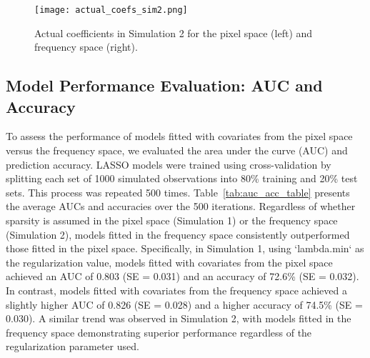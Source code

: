 \documentclass[12pt]{article}
\begin{document}
\begin{figure}[h!]
	\centering
	\texttt{[image: actual\_coefs\_sim2.png]}
	\caption{Actual coefficients in Simulation 2 for the pixel space (left) and frequency space (right).}
	\label{fig:coefs_sim2}
\end{figure}

\FloatBarrier

\subsection*{Model Performance Evaluation: AUC and Accuracy}

To assess the performance of models fitted with covariates from the pixel space versus the frequency space, we evaluated
the area under the curve (AUC) and prediction accuracy. LASSO models were trained using cross-validation by splitting
each set of 1000 simulated observations into 80\% training and 20\% test sets. This process was repeated 500 times.
Table~\ref*{tab:auc_acc_table} presents the average AUCs and accuracies over the 500 iterations. Regardless of whether
sparsity is assumed in the pixel space (Simulation 1) or the frequency space (Simulation 2), models fitted in the
frequency space consistently outperformed those fitted in the pixel space. Specifically, in Simulation 1, using
`lambda.min` as the regularization value, models fitted with covariates from the pixel space achieved an AUC of
0.803 (SE = 0.031) and an accuracy of 72.6\% (SE = 0.032). In contrast, models fitted with covariates from the
frequency space achieved a slightly higher AUC of 0.826 (SE = 0.028) and a higher accuracy of
74.5\% (SE = 0.030). A similar trend was observed in Simulation 2, with models fitted in the frequency space
demonstrating superior performance regardless of the regularization parameter used.
\end{document}
